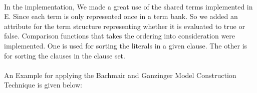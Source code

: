 \begin{algorithm}[H]
\begin{algorithmic}[1]

				\end{algorithmic}
			\end{algorithm}

		\paragraph{}
		In the implementation, We made a great use of the shared terms implemented in E. Since each term is only represented once in a term bank. So we added an attribute for the term structure representing whether it is evaluated to true or false. Comparison functions that takes the ordering into consideration were implemented. One is used for sorting the literals in a given clause. The other is for sorting the clauses in the clause set.		
		
		
		\paragraph{}
		An Example for applying the Bachmair and Ganzinger Model Construction Technique is given below:

